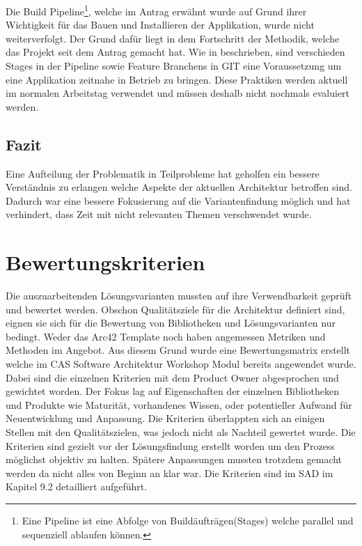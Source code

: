 Die Build Pipeline\footnote{Eine Pipeline ist eine Abfolge von Buildäufträgen(Stages) welche parallel und sequenziell ablaufen können. }, welche im Antrag erwähnt wurde auf Grund ihrer Wichtigkeit für das Bauen und Installieren der Applikation, wurde nicht weiterverfolgt. Der Grund dafür liegt in dem Fortschritt der Methodik, welche das Projekt seit dem Antrag gemacht hat. Wie in \cite{atlassiancd} beschrieben, sind verschieden Stages in der Pipeline sowie Feature Branchens in GIT eine Voraussetzung um eine Applikation zeitnahe in Betrieb zu bringen. Diese Praktiken werden aktuell im normalen Arbeitstag verwendet und müssen deshalb nicht nochmals evaluiert werden.

\subsection{Fazit}

Eine Aufteilung der Problematik in Teilprobleme hat geholfen ein bessere Verständnis zu erlangen welche Aspekte der aktuellen Architektur betroffen sind. Dadurch war eine bessere Fokusierung auf die Variantenfindung möglich und hat verhindert, dass Zeit mit nicht relevanten Themen verschwendet wurde.

\section{Bewertungskriterien}

Die auszuarbeitenden Lösungsvarianten mussten auf ihre Verwendbarkeit geprüft und bewertet werden. Obschon Qualitätsziele für die Architektur definiert sind, eignen sie sich für die Bewertung von Bibliotheken und Lösungsvarianten nur bedingt. Weder das Arc42 Template noch \cite{esa} haben angemessen Metriken und Methoden im Angebot. Aus diesem Grund wurde eine Bewertungsmatrix erstellt welche im CAS Software Architektur Workshop Modul bereits angewendet wurde. Dabei sind die einzelnen Kriterien mit dem Product Owner abgesprochen und gewichtet worden. Der Fokus lag auf Eigenschaften der einzelnen Bibliotheken und Produkte wie Maturität, vorhandenes Wissen, oder potentieller Aufwand für Neuentwicklung und Anpassung. Die Kriterien überlappten sich an einigen Stellen mit den Qualitätszielen, was jedoch nicht als Nachteil gewertet wurde. Die Kriterien sind gezielt vor der Lösungsfindung erstellt worden um den Prozess möglichst objektiv zu halten. Spätere Anpassungen mussten trotzdem gemacht werden da nicht alles von Beginn an klar war. Die Kriterien sind im SAD im Kapitel 9.2 detailliert aufgeführt.

